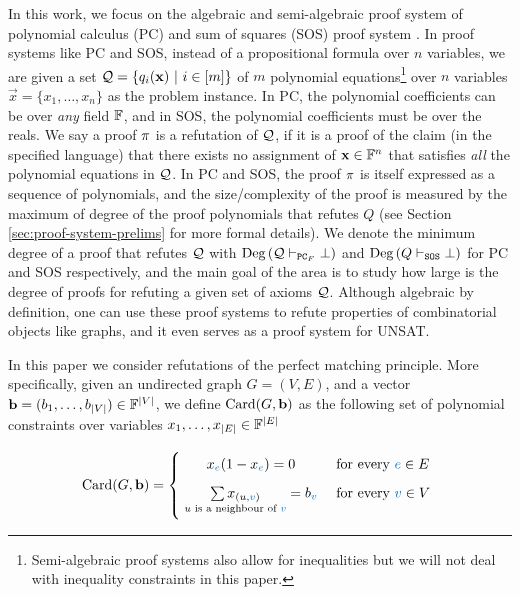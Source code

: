 \documentclass[11pt]{article}
\begin{document}
In this work, we focus on the algebraic and semi-algebraic proof system of polynomial calculus (PC) \citep{alekhnovich2004pseudorandom} and sum of squares (SOS) proof system \citep{parrilo2000structured, boazCourse}.
In proof systems like PC and SOS, instead of a propositional formula over $n$ variables, we are given a set $\mathcal{Q} =\{q_i(\mathbf{x}) \text{ } |\text{ } i \in [m] \}$ of $m$ polynomial equations\footnote{Semi-algebraic proof systems also allow for inequalities but we will not deal with inequality constraints in this paper.} over $n$ variables $\vec{x} = \{x_1, \dots, x_n\}$ as the problem instance.
In PC, the polynomial coefficients can be over \emph{any} field $\mathbb{F}$, and in SOS, the polynomial coefficients must be over the reals.
We say a proof $\pi$ is a refutation of $\mathcal{Q}$, if it is a proof of the claim (in the specified language) that there exists no assignment of $\mathbf{x} \in \mathbb{F}^n$ that satisfies \emph{all} the polynomial equations in $\mathcal{Q}$. 
In PC and SOS, the proof $\pi$ is itself expressed as a sequence of polynomials, and 
the size/complexity of the proof is measured by the maximum of degree of the proof polynomials that refutes $Q$ (see Section \ref{sec:proof-system-prelims} for more formal details).
We denote the minimum degree of a proof that refutes $\mathcal{Q}$ with $\text{Deg}\left(\mathcal{Q} \vdash_{\texttt{PC}_F} \bot\right)$ and $\text{Deg}\left(Q \vdash_{\texttt{SOS}} \bot\right)$ for PC and SOS respectively, and the main goal of the area is to study how large is the degree of proofs for refuting a given set of axioms $\mathcal{Q}$.
Although algebraic by definition, one can use these proof systems to refute properties of combinatorial objects like graphs, and it even serves as a proof system for UNSAT.\par
In this paper we consider refutations of the perfect matching principle.
More specifically, given an undirected graph $G=(V,E)$, and a vector $\mathbf{b} = (b_1, \dots, b_{|V|})  \in \mathbb{F}^{|V|}$, we define $\text{Card}(G, \mathbf{b})$ as the following set of polynomial constraints over variables $x_1, \dots, x_{|E|} \in \mathbb{F}^{|E|}$

\[
        \Card{G, \vec{b}}=
        \Bigger[10]\{\begin{array}{@{}cl}
                x_{\highlight{e}}(1 - x_{\highlight{e}}) = 0 & \text{ for every $\highlight{e} \in E$}\\[3mm]
                \underset{u \text{ is a neighbour of }\highlight{v}}{\sum x_{(u,\highlight{v})}}= b_{\highlight{v}} & \text{ for every $\highlight{v} \in V$} \\[3mm]
        \end{array}
\]
\end{document}
